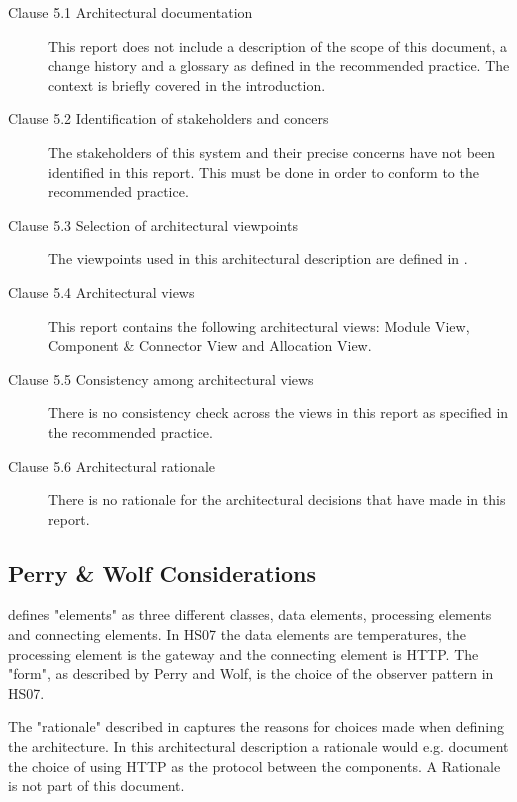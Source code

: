 \documentclass[a4paper,10pt]{article}
\begin{document}
\begin{description}
	\item[Clause 5.1 Architectural documentation] This report does not include a description of the
		scope of this document, a change history and a glossary as defined in the recommended practice.
		The context is briefly covered in the introduction.
	\item[Clause 5.2 Identification of stakeholders and concers] The stakeholders of this system and
		their precise concerns have not been identified in this report. This must be done in order to
		conform to the recommended practice.
	\item[Clause 5.3 Selection of architectural viewpoints] The viewpoints used in this architectural
		description are defined in \cite{christensen2004archdesc}.
	\item[Clause 5.4 Architectural views] This report contains the following architectural views: Module
		View, Component \& Connector View and Allocation View.
	\item[Clause 5.5 Consistency among architectural views] There is no consistency check across the views
		in this report as specified in the recommended practice.
	\item[Clause 5.6 Architectural rationale] There is no rationale for the architectural decisions
		that have made in this report.
\end{description}


\subsection{Perry \& Wolf Considerations}

\cite{perrywolf1992} defines "elements" as three different classes, data elements,
processing elements and connecting elements. In HS07 the data elements are
temperatures, the processing element is the gateway and the connecting element
is HTTP. The "form", as described by Perry and Wolf, is the choice of the observer
pattern in HS07.

The "rationale" described in \cite{perrywolf1992} captures the reasons for choices
made when defining the architecture. In this architectural description a rationale
would e.g. document the choice of using HTTP as the protocol between the components. A
Rationale is not part of this document.




\end{document}
